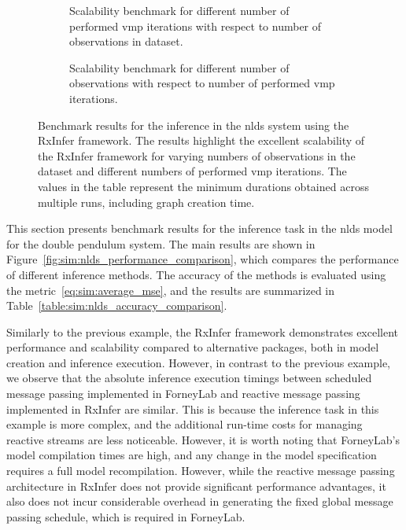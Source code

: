 \begin{figure}
  \centering
  \begin{subfigure}[t]{\textwidth}
    \centering
    \caption{
      Scalability benchmark for different number of performed \ac{vmp} iterations with respect to number of observations in dataset.
    }
    \label{fig:sim:pendulum_example_scalability_size}
  \end{subfigure}
  \hfill
  \begin{subfigure}[t]{\textwidth}
    \centering
    \caption{Scalability benchmark for different number of observations with respect to number of performed \ac{vmp} iterations.}
    \label{fig:sim:pendulum_example_scalability_nits}
  \end{subfigure}
  \caption{
    Benchmark results for the inference in the \ac{nlds} system using the RxInfer framework.
    The results highlight the excellent scalability of the RxInfer framework for varying numbers
    of observations in the dataset and different numbers of performed \ac{vmp} iterations.
    The values in the table represent the minimum durations obtained across multiple runs,
    including graph creation time.
  }
  \label{fig:sim:pendulum_example_scalability}
\end{figure}

This section presents benchmark results for the inference task in the \ac{nlds} model for the double
pendulum system.
The main results are shown in Figure~\ref{fig:sim:nlds_performance_comparison}, which compares
the performance of different inference methods.
The accuracy of the methods is evaluated using the metric~\eqref{eq:sim:average_mse}, and the
results are summarized in Table~\ref{table:sim:nlds_accuracy_comparison}.

Similarly to the previous example, the RxInfer framework demonstrates excellent performance and
scalability compared to alternative packages, both in model creation and inference execution.
However, in contrast to the previous example, we observe that the absolute inference execution
timings between scheduled message passing implemented in ForneyLab and reactive message
passing implemented in RxInfer are similar.
This is because the inference task in this example is more complex, and the additional
run-time costs for managing reactive streams are less noticeable.
However, it is worth noting that ForneyLab's model compilation times are high, and any change
in the model specification requires a full model recompilation.
However, while the reactive message passing architecture in RxInfer does not provide
significant performance advantages, it also does not incur considerable overhead in generating
the fixed global message passing schedule, which is required in ForneyLab.

